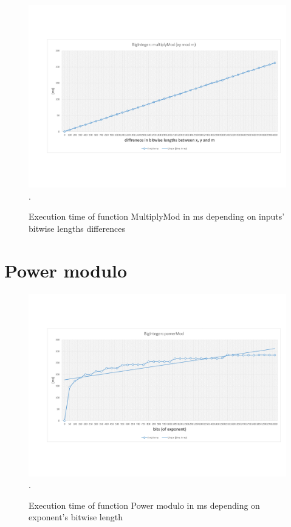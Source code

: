 \documentclass[oneside,openright,12pt,final,en]{mgr}
\begin{document}
\begin{figure}[H]
	\centering
	\includegraphics[width=\textwidth,trim={0.5cm 2.8cm 0.4cm 2.8cm},clip]{mull_mod_diff.pdf}.
	\caption{Execution time of function MultiplyMod in ms depending on inputs' bitwise lengths differences}
	\label{fig:mull_mod_diff}
\end{figure}

\section{Power modulo}

\begin{figure}[H]
	\centering
	\includegraphics[width=\textwidth,trim={0.5cm 2.8cm 0.4cm 2.8cm},clip]{powmod.pdf}.
	\caption{Execution time of function Power modulo in ms depending on exponent's bitwise length}
	\label{fig:powmod}
\end{figure}
\end{document}
